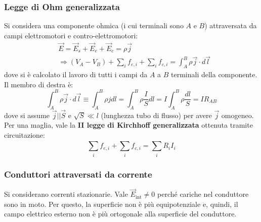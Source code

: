 \documentclass[a4paper]{scrartcl}
\numberwithin{equation}{subsection}
\theoremstyle{style1}
\begin{document}
\subsubsection{Legge di Ohm generalizzata}

Si considera una componente ohmica (i cui terminali sono $A$ e $B$) attraversata da campi elettromotori e contro-elettromotori:
\begin{equation}
	\begin{split}
		&\vec{E} = \vec{E}_s + \vec{E}_e + \vec{E}_c = \rho \vec{j}\\
		&\Rightarrow (V_A - V_B) + \sum_{i}^{} f_{e,i} + \sum_{i}^{} f_{c,i} = \int_{A} ^B \rho \vec{j}\cdot d\vec{l} 
	\end{split}
\end{equation}
dove si \`e calcolato il lavoro di tutti i campi da $A$ a $B$ terminali della componente. Il membro di destra \`e:
\begin{equation}
	\int_{A} ^B \rho \vec{j}\cdot d\vec{l} \equiv \int_{A} ^B \rho  j dl = \int_{A} ^B \rho  \frac{I}{S} dl = I \int_{A} ^B \rho  \frac{dl}{S} = I R_{AB} 
\end{equation}
dove si assume $\vec{j}| | \vec{S}$ e $\sqrt{S} \ll l$ (lunghezza tubo di flusso) per avere $\vec{j}$ omogeneo. Per una maglia, vale la \textbf{II legge di Kirchhoff generalizzata} ottenuta tramite circuitazione:
\begin{equation}
\sum_{i}^{} f_{e,i} + \sum_{i}^{} f_{c,i} = \sum_{i}^{} R_i I_i
\end{equation}
\subsubsection{Conduttori attraversati da corrente}

Si considerano correnti stazionarie. Vale $\vec{E}_\text{int}\neq 0$ perch\'e cariche nel conduttore sono in moto. Per questo, la superficie non \`e pi\`u equipotenziale e, quindi, il campo elettrico esterno non \`e pi\`u ortogonale alla superficie del conduttore.
\end{document}
